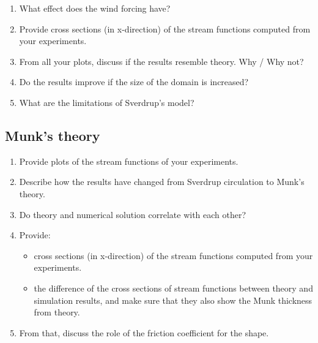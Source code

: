 \begin{question}
\begin{enumerate}
\item What effect does the wind forcing have? 

\item Provide cross sections (in x-direction) of the stream functions computed from your experiments. 

\item From all your plots, discuss if the results resemble theory. Why / Why not? 

\item Do the results improve if the size of the domain is increased? 

\item What are the limitations of Sverdrup's model? 
\end{enumerate}

\subsection*{Munk's theory}

\begin{enumerate}
\item Provide plots of the stream functions of your experiments. 

\item Describe how the results have changed from Sverdrup circulation to Munk’s theory. 

\item Do theory and numerical solution correlate with each other? 

\item Provide:
\begin{itemize}
    \item cross sections (in x-direction) of the stream functions computed from your experiments. 
    \item the difference of the cross sections of stream functions between theory and simulation results, and make sure that they also show the Munk thickness from theory. 
\end{itemize}

\item From that, discuss the role of the friction coefficient for the shape. 
\end{enumerate}
\end{question}